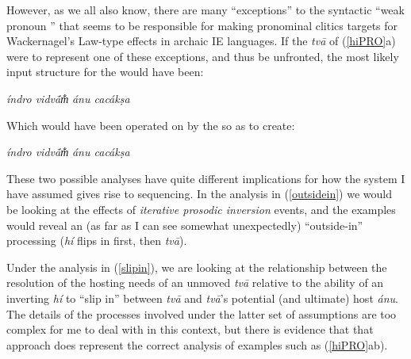 \documentclass[output=paper,
modfonts
]{LSP/langsci}
\begin{document}
However, as we all also know, there are many ``exceptions'' to the syntactic ``weak pronoun '' that seems
to be responsible for making pronominal clitics targets for Wackernagel's Law-type effects in archaic IE languages. If the
\textit{tvā} of (\ref{hiPRO}a) were to represent one of these exceptions, and thus be unfronted, the most likely input structure for the  would have been:


\begin{exe}
\ex\label{slipin}
{\ob} \textit{índro vidvā́m̐}{\cb} {\ob} {\textit{}} {\ob}\textit{ánu  cacákṣa}{\cb}{\cb}
\end{exe}

Which would have been operated on by the  so as to create:

\vspace*{1ex}
\begin{exe}\ex
{\ob} \textit{índro vidvā́m̐}{\cb} {\ob} {\textcolor{gray}{\textit{}}} {\ob}\textit{ánu   cacákṣa}{\cb}{\cb}  
\end{exe}

These two possible analyses have quite different implications for how the system I have assumed gives rise to
 sequencing. In the analysis in (\ref{outsidein}) we would be looking at the effects of \textit{iterative prosodic inversion}
events, and the examples would reveal an (as far as I can see somewhat unexpectedly) ``outside-in'' processing (\textit{hí} flips in 
first, then \textit{tvā}).

Under the analysis in (\ref{slipin}), we are looking at the relationship between the resolution of the hosting
needs of an unmoved \textit{tvā} relative to the ability of an inverting \textit{hí} to ``slip in'' between \textit{tvā}
and \textit{tvā}'s potential (and ultimate) host \textit{ánu}. 
The details of the processes involved under the latter set of assumptions are too complex for me to
deal with in this context, but there is evidence that that approach does represent the correct analysis of examples such
as (\ref{hiPRO}ab). 
\end{document}
